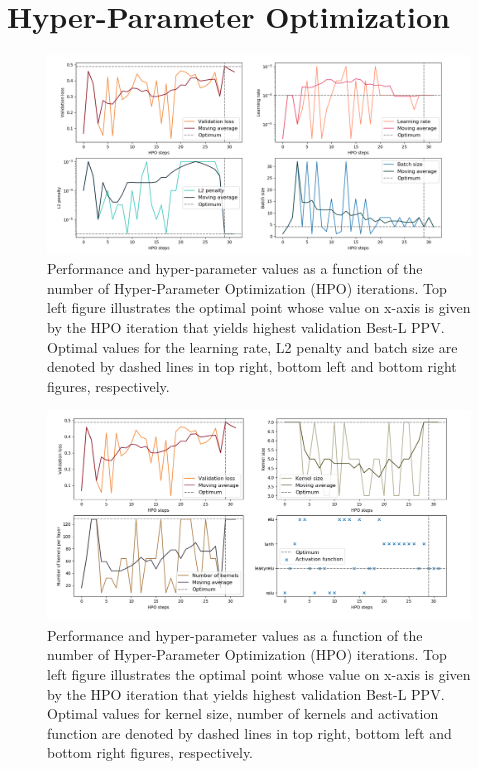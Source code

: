 
\section{Hyper-Parameter Optimization}

    \begin{figure}[H]
        \begin{center}
            \includegraphics[width=\textwidth, keepaspectratio]{imgs/hpo.png}
            \caption{Performance and hyper-parameter values as a function of the number
            of Hyper-Parameter Optimization (HPO) iterations.
            Top left figure illustrates the optimal point whose value on x-axis
            is given by the HPO iteration that yields highest validation Best-L PPV.
            Optimal values for the learning rate, L2 penalty and batch size are denoted
            by dashed lines in top right, bottom left and bottom right figures, respectively.}
            \label{hpoparams}
        \end{center}
    \end{figure}

    \begin{figure}[H]
        \begin{center}
            \includegraphics[width=\textwidth, keepaspectratio]{imgs/hpo2.png}
            \caption{Performance and hyper-parameter values as a function of the number
            of Hyper-Parameter Optimization (HPO) iterations.
            Top left figure illustrates the optimal point whose value on x-axis
            is given by the HPO iteration that yields highest validation Best-L PPV.
            Optimal values for kernel size, number of kernels and activation function are denoted
            by dashed lines in top right, bottom left and bottom right figures, respectively.}
            \label{hpoparams2}
        \end{center}
    \end{figure}

